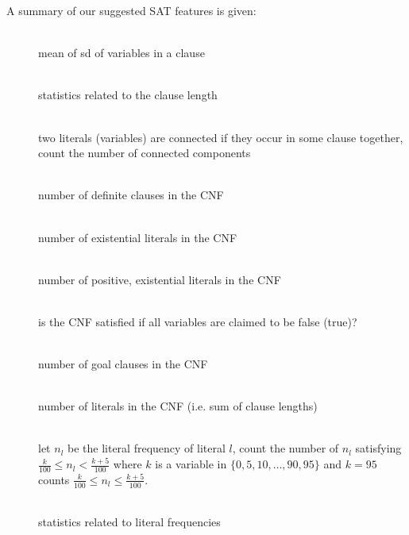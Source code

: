 A summary of our suggested SAT features is given:

\begin{description}
\item[] \hfill{} \\
  mean of sd of variables in a clause
\item[] \hfill{} \\
  statistics related to the clause length
\item[] \hfill{} \\
  two literals (variables) are connected if they occur in some clause together,
  count the number of connected components
\item[] \hfill{} \\
  number of definite clauses in the CNF
\item[] \hfill{} \\
  number of existential literals in the CNF
\item[] \hfill{} \\
  number of positive, existential literals in the CNF
\item[] \hfill{} \\
  is the CNF satisfied if all variables are claimed to be false (true)?
\item[] \hfill{} \\
  number of goal clauses in the CNF
\item[] \hfill{} \\
  number of literals in the CNF (i.e. sum of clause lengths)
\item[] \hfill{} \\
  let $n_l$ be the literal frequency of literal $l$,
  count the number of $n_l$ satisfying $\frac{k}{100} \leq n_l < \frac{k+5}{100}$
  where $k$ is a variable in $\{0,5,10,\ldots,90,95\}$ and $k=95$ counts
  $\frac{k}{100} \leq n_l \leq \frac{k+5}{100}$.
\item[] \hfill{} \\
  statistics related to literal frequencies
\item[] \hfill{} \\

\end{description}
